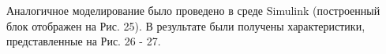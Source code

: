\documentclass[10pt,a4paper]{article}
\begin{document}
                                                                                                                                                                                                                                                                                                                                                                                                                                                                                                                                                                                                                                                                                                                                                                                                    Аналогичное моделирование было проведено в среде Simulink (построенный блок отображен на Рис. 25). В результате были получены характеристики, представленные на Рис. 26 - 27.
\end{document}
